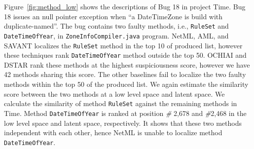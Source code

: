 Figure~\ref{fig:method_low} shows the descriptions of Bug 18 in project Time. Bug 18 issues an null pointer exception when ``a DateTimeZone is build with duplicate-named''. The bug contains two faulty methods, i.e., \texttt{RuleSet} and \texttt{DateTimeOfYear}, in \texttt{ZoneInfoCompiler.java} program. NetML, AML, and SAVANT localizes the \texttt{RuleSet} method in the top 10 of produced list, however these techniques rank \texttt{DateTimeOfYear} method outside the top 50. OCHIAI and DSTAR rank these methods at the highest suspiciousness score, however we have 42 methods sharing this score. The other baselines fail to localize the two faulty methods within the top 50 of the produced list. We again estimate the similarity score between the two methods at a low level space and latent space. We calculate the similarity of method \texttt{RuleSet} against the remaining methods in Time. Method \texttt{DateTimeOfYear} is ranked at position \textit{\#} 2,678 and \textit{\#}2,468 in the low level space and latent space, respectively. It shows that these two methods independent with each other, hence NetML is unable to localize method \texttt{DateTimeOfYear}.


